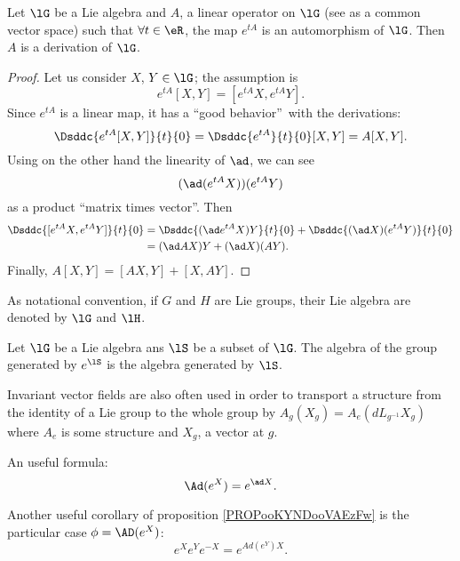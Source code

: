 \begin{lemma}
	Let $\lG$ be a Lie algebra and $A$, a linear operator on $\lG$ (see as a common vector space) such that $\forall t\in\eR$, the map $e^{tA}$ is an automorphism of $\lG$. Then $A$ is a derivation of $\lG$.
	\label{lem:autom_derr}
\end{lemma}

\begin{proof}
	Let us consider $X$, $Y\in\lG$;  the assumption is
	\[
		e^{tA}[X,Y]=[e^{tA}X,e^{tA}Y].
	\]
	Since $e^{tA}$ is a linear map, it has a ``good behavior''\ with the derivations:
	\[
		\Dsddc{e^{tA}[X,Y]}{t}{0}=\Dsddc{e^{tA}}{t}{0}[X,Y]=A[X,Y].
	\]
	Using on the other hand the linearity of $\ad$, we can see
	\[
		(\ad(e^{tA}X))(e^{tA}Y)
	\]
	as a product ``matrix times vector''. Then
	\begin{equation}
		\begin{split}
			\Dsddc{[e^{tA}X,e^{tA}Y]}{t}{0}&=\Dsddc{(\ad e^{tA}X)Y}{t}{0}+\Dsddc{(\ad X)(e^{tA}Y)}{t}{0}\\
			&=(\ad AX)Y+(\ad X)(AY).
		\end{split}
	\end{equation}
	Finally, $A[X,Y]=[AX,Y]+[X,AY]$.

\end{proof}

As notational convention, if $G$ and $H$ are Lie groups, their Lie algebra are denoted by $\lG$ and $\lH$.

\begin{lemma}		\label{LemAlgEtGroupesGenere}
	Let $\lG$ be a Lie algebra ans $\lS$ be a subset of $\lG$. The algebra of the group generated by $ e^{\lS}$ is the algebra generated by $\lS$.
\end{lemma}

Invariant vector fields are also often used in order to transport a structure from the identity of a Lie group to the whole group by $A_g(X_g)=A_e(dL_{g^{-1}}X_g)$ where $A_e$ is some structure and $X_g$, a vector at $g$.


\begin{corollary}\label{Ad_e}
	An useful formula:
	\[
		\Ad(e^X)=e^{\ad X}.
	\]
\end{corollary}

\begin{corollary}
	Another useful corollary of proposition \ref{PROPooKYNDooVAEzFw} is the particular case $\phi=\AD(e^X)$:
	\[
		e^Xe^Ye^{-X}=e^{Ad(e^Y)X}.
	\]
	\label{cor:eXeYe-X}
\end{corollary}

